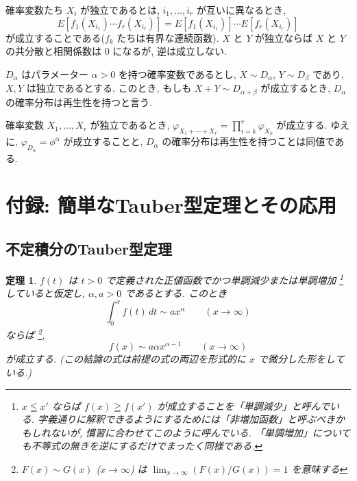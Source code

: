 \documentclass[12pt,twoside]{jarticle}
\theoremstyle{jplain}
\newtheorem{theorem}{定理}
\theoremstyle{jplain}
\theoremstyle{jplain}
\numberwithin{theorem}{section}
\numberwithin{equation}{section}
\numberwithin{figure}{section}
\numberwithin{table}{section}
\begin{document}
確率変数たち $X_i$ が独立であるとは,
$i_1,\ldots,i_r$ が互いに異なるとき,
\[
E[f_1(X_{i_1})\cdots f_r(X_{i_r})]
=
E[f_1(X_{i_1})]\cdots E[f_r(X_{i_r})]
\]
が成立することである($f_k$ たちは有界な連続函数).
$X$ と $Y$ が独立ならば $X$ と $Y$ の共分散と相関係数は $0$ になるが,
逆は成立しない.

$D_\alpha$ はパラメーター $\alpha>0$ を持つ確率変数であるとし,
$X\sim D_\alpha$, $Y\sim D_\beta$ であり, $X,Y$ は独立であるとする.
このとき, もしも $X+Y\sim D_{\alpha+\beta}$ が成立するとき,
$D_\alpha$ の確率分布は再生性を持つと言う.

確率変数 $X_1,\ldots,X_r$ が独立であるとき,
$\varphi_{X_1+\cdots+X_r}=\prod_{i=k}^r\varphi_{X_k}$ が成立する.
ゆえに, $\varphi_{D_\alpha}=\phi^\alpha$ が成立することと,
$D_\alpha$ の確率分布は再生性を持つことは同値である.


\section{付録: 簡単なTauber型定理とその応用}
\label{sec:Tauber}

\subsection{不定積分のTauber型定理}

\begin{theorem}
$f(t)$ は $t>0$ で定義された正値函数でかつ単調減少または単調増加%
\footnote{$x\leqq x'$ ならば $f(x)\geqq f(x')$ が成立することを「単調減少」と呼んでいる.
字義通りに解釈できるようにするためには「非増加函数」と呼ぶべきかもしれないが,
慣習に合わせてこのように呼んでいる.
「単調増加」についても不等式の無きを逆にするだけでまったく同様である.}%
していると仮定し, $\alpha,a>0$ であるとする. このとき
\[
\int_0^x f(t)\,dt \sim a x^\alpha \qquad (x\to\infty)
\]
ならば%
\footnote{$F(x)\sim G(x)$ ($x\to\infty$) は
$\lim_{x\to\infty}(F(x)/G(x))=1$ を意味する},
\[
f(x) \sim a \alpha x^{\alpha-1} \qquad (x\to\infty)
\]
が成立する. (この結論の式は前提の式の両辺を形式的に $x$ で微分した形をしている.)
\end{theorem}
\end{document}
